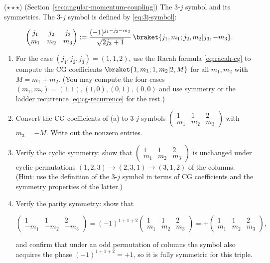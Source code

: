 \begin{problemset}
\item ($\star\star\star$) (Section~\ref{sec:angular-momentum-coupling}) The $3$-$j$ symbol and its symmetries. The $3$-$j$ symbol is defined by \eqref{eq:3j-symbol}:
\begin{linenomath}
\begin{equation*}
\begin{pmatrix}j_1 & j_2 & j_3 \\ m_1 & m_2 & m_3\end{pmatrix}
:= \frac{(-1)^{j_1-j_2-m_3}}{\sqrt{2j_3+1}}\,
\braket{j_1,m_1;j_2,m_2|j_3,-m_3}.
\end{equation*}
\end{linenomath}
\begin{enumerate}
\item[(a)] For the case $(j_1,j_2,j_3) = (1,1,2)$, use the Racah formula \eqref{eq:racah-cg} to compute the CG coefficients $\braket{1,m_1;1,m_2|2,M}$ for all $m_1,m_2$ with $M=m_1+m_2$. (You may compute the four cases $(m_1,m_2) = (1,1), (1,0), (0,1), (0,0)$ and use symmetry or the ladder recurrence \eqref{eq:cg-recurrence} for the rest.)
\item[(b)] Convert the CG coefficients of (a) to $3$-$j$ symbols $\begin{pmatrix}1&1&2\\m_1&m_2&m_3\end{pmatrix}$ with $m_3 = -M$. Write out the nonzero entries.
\item[(c)] Verify the cyclic symmetry: show that $\begin{pmatrix}1&1&2\\m_1&m_2&m_3\end{pmatrix}$ is unchanged under cyclic permutations $(1,2,3)\to(2,3,1)\to(3,1,2)$ of the columns. (Hint: use the definition of the $3$-$j$ symbol in terms of CG coefficients and the symmetry properties of the latter.)
\item[(d)] Verify the parity symmetry: show that
\begin{linenomath}
\begin{equation*}
\begin{pmatrix}1&1&2\\ -m_1 & -m_2 & -m_3\end{pmatrix}
= (-1)^{1+1+2}
\begin{pmatrix}1&1&2\\ m_1 & m_2 & m_3\end{pmatrix}
= +\begin{pmatrix}1&1&2\\ m_1 & m_2 & m_3\end{pmatrix},
\end{equation*}
\end{linenomath}
and confirm that under an odd permutation of columns the symbol also acquires the phase $(-1)^{1+1+2}=+1$, so it is fully symmetric for this triple.
\end{enumerate}


\end{problemset}
